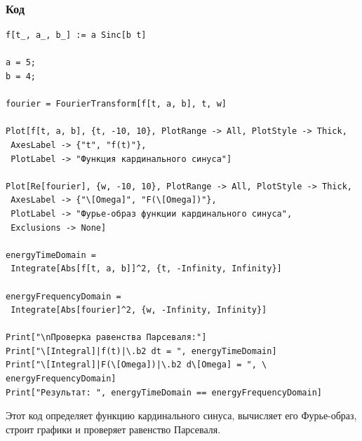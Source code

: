 \documentclass[a4paper,12pt]{article}
\begin{document}
\subsubsection{Код}
\begin{lstlisting}[caption=Фурье-образ кардинального синуса и проверка равенства Парсеваля]
f[t_, a_, b_] := a Sinc[b t]

a = 5;
b = 4;

fourier = FourierTransform[f[t, a, b], t, w]

Plot[f[t, a, b], {t, -10, 10}, PlotRange -> All, PlotStyle -> Thick, 
 AxesLabel -> {"t", "f(t)"}, 
 PlotLabel -> "Функция кардинального синуса"]

Plot[Re[fourier], {w, -10, 10}, PlotRange -> All, PlotStyle -> Thick, 
 AxesLabel -> {"\[Omega]", "F(\[Omega])"}, 
 PlotLabel -> "Фурье-образ функции кардинального синуса", 
 Exclusions -> None]

energyTimeDomain = 
 Integrate[Abs[f[t, a, b]]^2, {t, -Infinity, Infinity}]

energyFrequencyDomain = 
 Integrate[Abs[fourier]^2, {w, -Infinity, Infinity}]

Print["\nПроверка равенства Парсеваля:"]
Print["\[Integral]|f(t)|\.b2 dt = ", energyTimeDomain]
Print["\[Integral]|F(\[Omega])|\.b2 d\[Omega] = ", \
energyFrequencyDomain]
Print["Результат: ", energyTimeDomain == energyFrequencyDomain]
\end{lstlisting}
Этот код определяет функцию кардинального синуса, вычисляет его Фурье-образ, строит графики и проверяет равенство Парсеваля.
\end{document}
